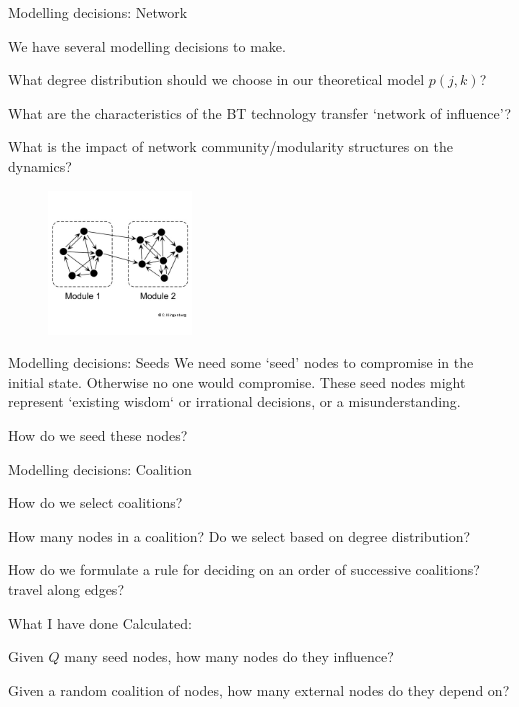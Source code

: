 \documentclass[10pt]{beamer}
\begin{document}
\begin{frame}{Modelling decisions: Network}

We have several modelling decisions to make.

What degree distribution should we choose in our theoretical model $p(j,k)$?

What are the characteristics of the BT technology transfer `network of influence'?

What is the impact of network community/modularity structures on the dynamics?

\begin{figure}[b]
\centering
\includegraphics[height=1.5in]{community.png}
\end{figure}

\end{frame}
\begin{frame}{Modelling decisions: Seeds}
We need some `seed' nodes to compromise in the initial state. Otherwise no one would compromise. These seed nodes might represent `existing wisdom` or irrational decisions, or a misunderstanding.

How do we seed these nodes?

\end{frame}
\begin{frame}{Modelling decisions: Coalition}

How do we select coalitions?

How many nodes in a coalition? Do we select based on degree distribution?

How do we formulate a rule for deciding on an order of successive coalitions? travel along edges?

\end{frame}

\begin{frame}{What I have done}
Calculated:

Given $Q$ many seed nodes, how many nodes do they influence?

Given a random coalition of nodes, how many external nodes do they depend on?

\end{frame}
\end{document}
